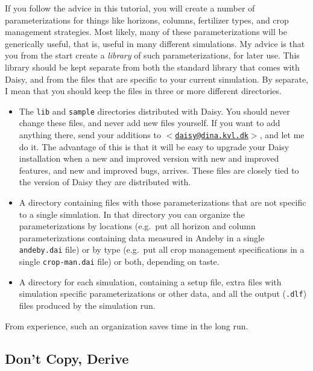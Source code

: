 \documentclass[a4paper]{article}
\begin{document}
If you follow the advice in this tutorial, you will create a number of
parameterizations for things like horizons, columns, fertilizer types,
and crop management strategies.  Most likely, many of these
parameterizations will be generically useful, that is, useful in many
different simulations.  My advice is that you from the start create a
\emph{library} of such parameterizations, for later use.  This library
should be kept separate from both the standard library that comes with
Daisy, and from the files that are specific to your current
simulation.  By separate, I mean that you should keep the files in
three or more different directories.
\begin{itemize}
\item The \texttt{lib} and \texttt{sample} directories distributed
  with Daisy.  You should never change these files, and never add new
  files yourself.  If you want to add anything there, send your
  additions to
  \href{mailto:daisy@dina.kvl.dk}{\texttt{$<$daisy@dina.kvl.dk$>$}},
  and let me do it.  The advantage of this is that it will be easy to
  upgrade your Daisy installation when a new and improved version
  with new and improved features, and new and improved bugs, arrives.
  These files are closely tied to the version of Daisy they are
  distributed with.
\item A directory containing files with those parameterizations that
  are not specific to a single simulation.  In that directory you can
  organize the parameterizations by locations (e.g.\ put all horizon
  and column parameterizations containing data measured in Andeby in a
  single \texttt{andeby.dai} file) or by type (e.g.\ put all crop
  management specifications in a single \texttt{crop-man.dai} file) or
  both, depending on taste.
\item A directory for each simulation, containing a setup file, extra
  files with simulation specific parameterizations or other data, and
  all the output (\texttt{.dlf}) files produced by the simulation run.
\end{itemize}
From experience, such an organization saves time in the long run.  

\subsection{Don't Copy, Derive}
\end{document}
